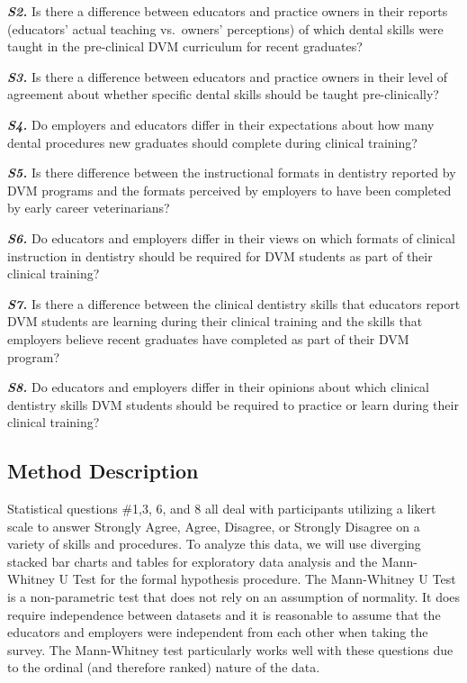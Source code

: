 \documentclass[
  11pt,
  letterpaper,
  DIV=11,
  numbers=noendperiod]{scrartcl}
\begin{document}
\textbf{\emph{S2.}} Is there a difference between educators and practice
owners in their reports (educators' actual teaching vs.~owners'
perceptions) of which dental skills were taught in the pre-clinical DVM
curriculum for recent graduates?

\textbf{\emph{S3.}} Is there a difference between educators and practice
owners in their level of agreement about whether specific dental skills
should be taught pre-clinically?

\textbf{\emph{S4.}} Do employers and educators differ in their
expectations about how many dental procedures new graduates should
complete during clinical training?

\textbf{\emph{S5.}} Is there difference between the instructional
formats in dentistry reported by DVM programs and the formats perceived
by employers to have been completed by early career veterinarians?

\textbf{\emph{S6.}} Do educators and employers differ in their views on
which formats of clinical instruction in dentistry should be required
for DVM students as part of their clinical training?

\textbf{\emph{S7.}} Is there a difference between the clinical dentistry
skills that educators report DVM students are learning during their
clinical training and the skills that employers believe recent graduates
have completed as part of their DVM program?

\textbf{\emph{S8.}} Do educators and employers differ in their opinions
about which clinical dentistry skills DVM students should be required to
practice or learn during their clinical training?

\subsection{Method Description}\label{method-description}

Statistical questions \#1,3, 6, and 8 all deal with participants
utilizing a likert scale to answer Strongly Agree, Agree, Disagree, or
Strongly Disagree on a variety of skills and procedures. To analyze this
data, we will use diverging stacked bar charts and tables for
exploratory data analysis and the Mann-Whitney U Test for the formal
hypothesis procedure. The Mann-Whitney U Test is a non-parametric test
that does not rely on an assumption of normality. It does require
independence between datasets and it is reasonable to assume that the
educators and employers were independent from each other when taking the
survey. The Mann-Whitney test particularly works well with these
questions due to the ordinal (and therefore ranked) nature of the data.
\end{document}
